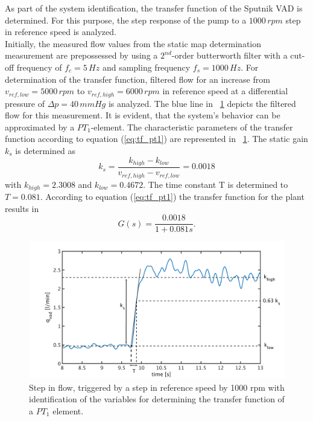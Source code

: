 As part of the system identification, the transfer function of the Sputnik VAD is determined. For this purpose, the step response of the pump to a $1000\,rpm$ step in reference speed is analyzed.
\\Initially, the measured flow values from the static map determination measurement are prepossessed by using a $2^{nd}$-order butterworth filter with a cut-off frequency of $f_c = 5\,Hz$ and sampling frequency $f_s=1000 \, Hz$. For determination of the transfer function, filtered flow for an increase from $v_{ref,low}=5000\,rpm$ to $v_{ref,high}=6000\,rpm$ in reference speed at a differential pressure of $\Delta{p}=40\,mmHg$ is analyzed. The blue line in \figurename~\ref{fig:plant} depicts the filtered flow for this measurement. It is evident, that the system's behavior can be approximated by a $PT_1$-element.
 The characteristic parameters of the transfer function according to equation (\ref{eq:tf_pt1}) are represented in \figurename~\ref{fig:plant}. The static gain $k_s$ is determined as
\begin{equation}
  k_s = \frac{k_{high}-k_{low}}{v_{ref,high}-v_{ref,low}}=0.0018
\label{eq:k_s_1}
\end{equation}
with $k_{high}=2.3008$ and $k_{low}=0.4672$. The time constant T is determined to $T=0.081$.
According to equation (\ref{eq:tf_pt1}) the transfer function for the plant results in
\begin{equation}
    G(s) = \frac{0.0018}{1+0.081s}.
 \label{eq:plant}
\end{equation}
\begin{figure}[ht]
  \centering
  \includegraphics[width=\textwidth]{images/chapt_4/plant_generation.pdf}
  \caption[Transfer function of Sputnik VAD]{Step in flow, triggered by a step in reference speed by 1000 rpm with identification of the variables for determining the transfer function of a $PT_1$ element.}
  \label{fig:plant}
\end{figure}
